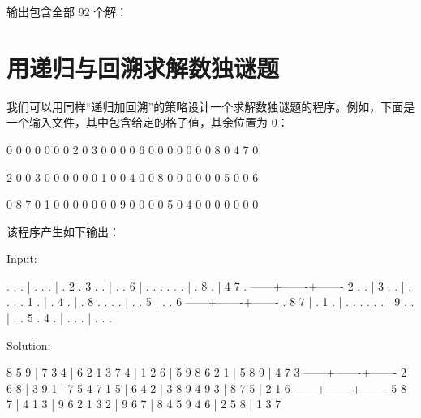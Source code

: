 输出包含全部 92 个解：


\section{用递归与回溯求解数独谜题}

我们可以用同样“递归加回溯”的策略设计一个求解数独谜题的程序。例如，下面是一个输入文件，其中包含给定的格子值，其余位置为 0：

\begin{codebox}
0 0 0   0 0 0   0 2 0
3 0 0   0 0 6   0 0 0
0 0 0   0 8 0   4 7 0

2 0 0   3 0 0   0 0 0
0 1 0   0 4 0   0 8 0
0 0 0   0 0 5   0 0 6

0 8 7   0 1 0   0 0 0
0 0 0   9 0 0   0 0 5
0 4 0   0 0 0   0 0 0
\end{codebox}

该程序产生如下输出：

\begin{codebox}
Input:

. . . | . . . | . 2 . 
3 . . | . . 6 | . . . 
. . . | . 8 . | 4 7 . 
------+-------+-------
2 . . | 3 . . | . . . 
. 1 . | . 4 . | . 8 . 
. . . | . . 5 | . . 6 
------+-------+-------
. 8 7 | . 1 . | . . . 
. . . | 9 . . | . . 5 
. 4 . | . . . | . . . 

Solution:

8 5 9 | 7 3 4 | 6 2 1 
3 7 4 | 1 2 6 | 5 9 8 
6 2 1 | 5 8 9 | 4 7 3 
------+-------+-------
2 6 8 | 3 9 1 | 7 5 4 
7 1 5 | 6 4 2 | 3 8 9 
4 9 3 | 8 7 5 | 2 1 6 
------+-------+-------
5 8 7 | 4 1 3 | 9 6 2 
1 3 2 | 9 6 7 | 8 4 5 
9 4 6 | 2 5 8 | 1 3 7 
\end{codebox}

